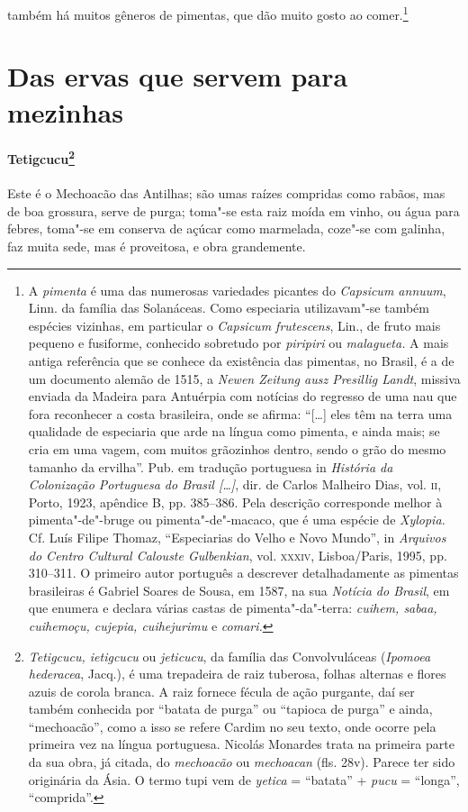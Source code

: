 também há muitos gêneros de pimentas, que dão muito gosto ao 
comer.\footnote{ A \textit{pimenta} é uma das numerosas variedades picantes
do \textit{Capsicum annuum}, Linn. da família das Solanáceas. Como
especiaria utilizavam"-se também espécies vizinhas, em particular o
\textit{Capsicum frutescens}, Lin., de fruto mais pequeno e fusiforme,
conhecido sobretudo por \textit{piripiri} ou \textit{malagueta.} A mais
antiga referência que se conhece da existência das pimentas, no
Brasil, é a de um documento alemão de 1515, a \textit{Newen Zeitung
ausz Presillig Landt}, missiva enviada da Madeira para Antuérpia com
notícias do regresso de uma nau que fora reconhecer a costa brasileira,
onde se afirma: ``[\ldots{}] eles têm na terra uma qualidade de especiaria
que arde na língua como pimenta, e ainda mais; se cria em uma vagem,
com muitos grãozinhos dentro, sendo o grão do mesmo tamanho da
ervilha''. Pub. em tradução portuguesa in \textit{História da
Colonização Portuguesa do Brasil [\ldots{}]}, dir. de Carlos Malheiro Dias,
vol. \textsc{ii}, Porto, 1923, apêndice B, pp. 385--386. Pela descrição
corresponde melhor à pimenta"-de"-bruge ou pimenta"-de"-macaco, que é uma
espécie de \textit{Xylopia.} Cf. Luís Filipe Thomaz, ``Especiarias do
Velho e Novo Mundo'', in \textit{Arquivos do Centro Cultural Calouste
Gulbenkian}, vol. \textsc{xxxiv}, Lisboa/Paris, 1995, pp. 310--311. O primeiro
autor português a descrever detalhadamente as pimentas brasileiras é
Gabriel Soares de Sousa, em 1587, na sua \textit{Notícia do Brasil}, 
em que enumera e declara várias castas de pimenta"-da"-terra:
\textit{cuihem, sabaa, cuihemoçu, cujepia, cuihejurimu} e \textit{comari.}} 

\section{Das ervas que servem para mezinhas}
\paragraph{Tetigcucu\footnote{ \textit{Tetigcucu, ietigcucu} ou
\textit{jeticucu}, da família das Convolvuláceas (\textit{Ipomoea
hederacea}, Jacq.), é uma trepadeira de raiz tuberosa, folhas alternas e
flores azuis de corola branca. A raiz fornece fécula de ação purgante,
daí ser também conhecida por ``batata de purga'' ou ``tapioca de purga'' e
ainda, ``mechoacão'', como a isso se refere Cardim no seu texto, onde
ocorre pela primeira vez na língua portuguesa. Nicolás Monardes trata
na primeira parte da sua obra, já citada, do \textit{mechoacão} ou
\textit{mechoacan} (fls. 28v). Parece ter sido originária da Ásia. O
termo tupi vem de \textit{yetica} = ``batata'' + \textit{pucu} = ``longa'',
``comprida''.}} Este é o Mechoacão das Antilhas; são umas
raízes compridas como rabãos, mas de boa grossura, serve de purga;
toma"-se esta raiz moída em vinho, ou água para febres, toma"-se em
conserva de açúcar como marmelada, coze"-se com galinha, faz muita sede,
mas é proveitosa, e obra grandemente.

